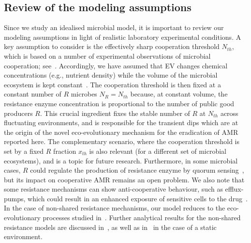 \documentclass{article}
\begin{document}
\subsection{Review of the modeling assumptions}\label{Sec:Discussion2}
Since we study an idealised microbial model, it is important to 
review our modeling assumptions in light of realistic laboratory experimental conditions. A key assumption to consider is the effectively sharp cooperation threshold \(N_{th}\), which is based on a number of experimental observations of microbial cooperation; see~\cite{davies1994inactivation, Wright05, Yurtsev13, sanchez2013feedback}. Accordingly, we have assumed that EV changes chemical concentrations (e.g., nutrient density) while  the volume of the microbial ecosystem is kept constant~\cite{sanchez2013feedback}. The cooperation threshold is then fixed at a constant number of $R$ microbes \(N_{R}=N_{th}\) because, at constant volume, the resistance enzyme concentration is proportional to the number of public good producers $R$. This crucial ingredient fixes the stable number of $R$ at \(N_{th}\) across fluctuating environments, and is responsible for the transient dips which are at the origin of the novel eco-evolutionary mechanism for the eradication of AMR reported here. The complementary scenario, where the cooperation threshold is set by a fixed $R$ fraction \(x_{th}\) is also relevant (for a different set of microbial ecosystems), and is a topic for future research. Furthermore, in some microbial cases, \(R\) could regulate the production of resistance enzyme by quorum sensing~\cite{pai2012optimality}, but its impact on cooperative AMR remains an open problem. We also note that some resistance mechanisms can show anti-cooperative behaviour, such as efflux-pumps, which could result in an enhanced exposure of sensitive cells to the drug~\cite{poole2007efflux, soto2013role}. In the case of non-shared resistance mechanisms, our model reduces to the eco-evolutionary processes studied in~\cite{wienand2017evolution, wienand2018eco, taitelbaum2020population, Shibasaki2021}. Further analytical results for the non-shared resistance models are discussed in~\cite{uecker2011fixation}, as well as in~\cite{lambert2006probability, parsons2007fixation, patwa2008fixation} in the case of a static environment.
\end{document}
